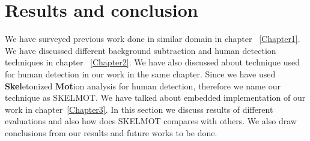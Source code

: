 \chapter{Results and conclusion} %
\label{Chapter4}
\indent We have surveyed previous work done in similar domain in chapter
~\ref{Chapter1}. We have discussed different background subtraction and
human detection techniques in chapter ~\ref{Chapter2}. We have also
discussed about technique used for human detection in our work in the
same chapter.  Since we have used \textbf{Skel}etonized \textbf{Mot}ion
analysis for human detection, therefore we name our technique as
SKELMOT. We have talked about embedded implementation of our work in
chapter~\ref{Chapter3}. In this section we discuss results of different
evaluations and also how does SKELMOT compares with others. We also draw
conclusions from our results and future works to be done.
